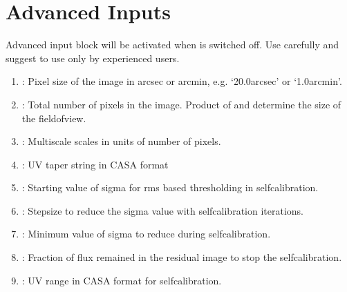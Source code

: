 \documentclass[letterpaper,10pt,english]{sphinxmanual}
\begin{document}
\section{Advanced Inputs}
\label{\detokenize{inputs:advanced-inputs}}
\sphinxAtStartPar
Advanced input block will be activated when  is switched off. Use  carefully and suggest to use only by experienced users.
\begin{enumerate}
%
\item {} 
\sphinxAtStartPar
{} : Pixel size of the image in arcsec or arcmin, e.g. ‘20.0arcsec’ or ‘1.0arcmin’.

\item {} 
\sphinxAtStartPar
{} : Total number of pixels in the image. Product of  and  determine the size of the field\sphinxhyphen{}of\sphinxhyphen{}view.

\item {} 
\sphinxAtStartPar
{} : Multiscale scales in units of number of pixels.

\item {} 
\sphinxAtStartPar
{} : UV taper string in CASA format

\item {} 
\sphinxAtStartPar
{} : Starting value of sigma for rms based thresholding in self\sphinxhyphen{}calibration.

\item {} 
\sphinxAtStartPar
{} : Stepsize to reduce the sigma value with self\sphinxhyphen{}calibration iterations.

\item {} 
\sphinxAtStartPar
{} : Minimum value of sigma to reduce during self\sphinxhyphen{}calibration.

\item {} 
\sphinxAtStartPar
{} : Fraction of flux remained in the residual image to stop the self\sphinxhyphen{}calibration.

\item {} 
\sphinxAtStartPar
{} : UV range in CASA format for self\sphinxhyphen{}calibration.


\end{enumerate}
\end{document}
